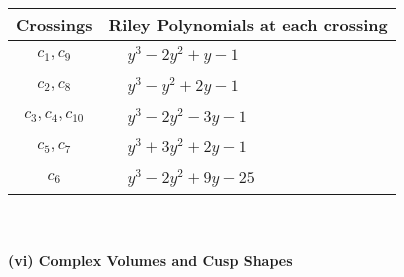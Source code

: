 \documentclass[1p]{elsarticle_modified}
\theoremstyle{definition}
\begin{document}
\begin{tabular}{m{50pt}|m{274pt}}
Crossings & \hspace{64pt}Riley Polynomials at each crossing \\
\hline $$\begin{aligned}c_{1},c_{9}\end{aligned}$$&$\begin{aligned}
&y^3-2 y^2+y-1
\end{aligned}$\\
\hline $$\begin{aligned}c_{2},c_{8}\end{aligned}$$&$\begin{aligned}
&y^3- y^2+2 y-1
\end{aligned}$\\
\hline $$\begin{aligned}c_{3},c_{4},c_{10}\end{aligned}$$&$\begin{aligned}
&y^3-2 y^2-3 y-1
\end{aligned}$\\
\hline $$\begin{aligned}c_{5},c_{7}\end{aligned}$$&$\begin{aligned}
&y^3+3 y^2+2 y-1
\end{aligned}$\\
\hline $$\begin{aligned}c_{6}\end{aligned}$$&$\begin{aligned}
&y^3-2 y^2+9 y-25
\end{aligned}$\\
\hline
\end{tabular}\\~\\
\newpage\flushleft \textbf{(vi) Complex Volumes and Cusp Shapes}
\end{document}
